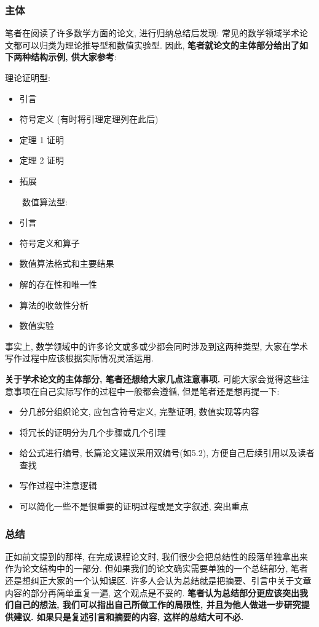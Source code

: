 \documentclass{formatBook}
\begin{document}
\subsubsection{主体}
笔者在阅读了许多数学方面的论文, 进行归纳总结后发现: 常见的数学领域学术论文都可以归类为理论推导型和数值实验型. 因此, \textbf{笔者就论文的主体部分给出了如下两种结构示例, 供大家参考}:
\begin{multicols}{2}
    理论证明型: 
    \begin{itemize}
        \item 引言
        \item 符号定义 (有时将引理定理列在此后)
        \item 定理 1 证明
        \item 定理 2 证明
        \item 拓展
    \end{itemize}
    \ \ \ \   数值算法型: 
    \begin{itemize}
        \item 引言
        \item 符号定义和算子
        \item 数值算法格式和主要结果
        \item 解的存在性和唯一性
        \item 算法的收敛性分析
        \item 数值实验
    \end{itemize}
\end{multicols}
\par 事实上, 数学领域中的许多论文或多或少都会同时涉及到这两种类型, 大家在学术写作过程中应该根据实际情况灵活运用. 
\par \textbf{关于学术论文的主体部分, 笔者还想给大家几点注意事项.} 可能大家会觉得这些注意事项在自己实际写作的过程中一般都会遵循, 但是笔者还是想再提一下: 
\begin{itemize}
    \item 分几部分组织论文, 应包含符号定义, 完整证明, 数值实现等内容
    \item 将冗长的证明分为几个步骤或几个引理
    \item 给公式进行编号, 长篇论文建议采用双编号(如5.2), 方便自己后续引用以及读者查找
    \item 写作过程中注意逻辑
    \item 可以简化一些不是很重要的证明过程或是文字叙述, 突出重点
\end{itemize}
\subsubsection{总结}
正如前文提到的那样, 在完成课程论文时, 我们很少会把总结性的段落单独拿出来作为论文结构中的一部分. 但如果我们的论文确实需要单独的一个总结部分, 笔者还是想纠正大家的一个认知误区. 许多人会认为总结就是把摘要、引言中关于文章内容的部分再简单重复一遍, 这个观点是不妥的. \textbf{笔者认为总结部分更应该突出我们自己的想法, 我们可以指出自己所做工作的局限性, 并且为他人做进一步研究提供建议. 如果只是复述引言和摘要的内容, 这样的总结大可不必.}
\end{document}
